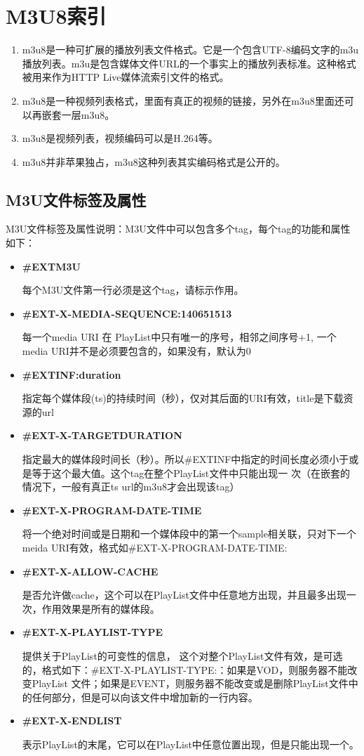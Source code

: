 \documentclass[bachelor]{thesis-uestc}
\begin{document}
\section{M3U8索引}

\begin{enumerate}
	\item m3u8是一种可扩展的播放列表文件格式。它是一个包含UTF-8编码文字的m3u播放列表。m3u是包含媒体文件URL的一个事实上的播放列表标准。这种格式被用来作为HTTP Live媒体流索引文件的格式。
	\item m3u8是一种视频列表格式，里面有真正的视频的链接，另外在m3u8里面还可以再嵌套一层m3u8。
	\item m3u8是视频列表，视频编码可以是H.264等。
	\item m3u8并非苹果独占，m3u8这种列表其实编码格式是公开的。
\end{enumerate}

\subsection{M3U文件标签及属性}


\par M3U文件标签及属性说明：M3U文件中可以包含多个tag，每个tag的功能和属性如下：

\begin{itemize}
	\item \textbf{\#EXTM3U}

		每个M3U文件第一行必须是这个tag，请标示作用。
	\item \textbf{\#EXT-X-MEDIA-SEQUENCE:140651513} 

		每一个media URI 在 PlayList中只有唯一的序号，相邻之间序号+1, 一个media URI并不是必须要包含的，如果没有，默认为0
	\item \textbf{\#EXTINF:duration} 

		指定每个媒体段(ts)的持续时间（秒），仅对其后面的URI有效，title是下载资源的url
	\item \textbf{\#EXT-X-TARGETDURATION}

		指定最大的媒体段时间长（秒）。所以\#EXTINF中指定的时间长度必须小于或是等于这个最大值。这个tag在整个PlayList文件中只能出现一 次（在嵌套的情况下，一般有真正ts url的m3u8才会出现该tag）
	\item \textbf{\#EXT-X-PROGRAM-DATE-TIME}

		将一个绝对时间或是日期和一个媒体段中的第一个sample相关联，只对下一个meida URI有效，格式如\#EXT-X-PROGRAM-DATE-TIME:
	\item \textbf{\#EXT-X-ALLOW-CACHE}

		是否允许做cache，这个可以在PlayList文件中任意地方出现，并且最多出现一次，作用效果是所有的媒体段。
	\item \textbf{\#EXT-X-PLAYLIST-TYPE}

		提供关于PlayList的可变性的信息， 这个对整个PlayList文件有效，是可选的，格式如下：\#EXT-X-PLAYLIST-TYPE:：如果是VOD，则服务器不能改变PlayList 文件；如果是EVENT，则服务器不能改变或是删除PlayList文件中的任何部分，但是可以向该文件中增加新的一行内容。
	\item \textbf{\#EXT-X-ENDLIST}

		表示PlayList的末尾，它可以在PlayList中任意位置出现，但是只能出现一个。
\end{itemize}
\end{document}
